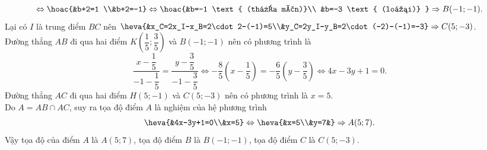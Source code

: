 \begin{bt}
{		\[\Leftrightarrow \hoac{&b+2=1 \\&b+2=-1} \Leftrightarrow \hoac{&b=-1 \text{ (thỏa mãn)}\\	&b=-3 \text{ (loại)} } \Rightarrow B(-1;-1).\]
		Lại có $I$ là trung điểm $BC$ nên $\heva{&x_C=2x_I-x_B=2\cdot 2-(-1)=5\\&y_C=2y_I-y_B=2\cdot(-2)-(-1)=-3} \Rightarrow C(5;-3)$.\\
		Đường thẳng $AB$ đi qua hai điểm $K\left(\dfrac{1}{5}; \dfrac{3}{5}\right)$ và $B(-1;-1)$ nên có phương trình là
		\[\dfrac{x-\dfrac{1}{5}}{-1-\dfrac{1}{5}}=\dfrac{y-\dfrac{3}{5}}{-1-\dfrac{3}{5}} \Leftrightarrow-\dfrac{8}{5}\left(x-\dfrac{1}{5}\right)=-\dfrac{6}{5}\left(y-\dfrac{3}{5}\right) \Leftrightarrow 4 x-3 y+1=0.\]
		Đường thẳng $AC$ đi qua hai điểm $H(5;-1)$ và $C(5;-3)$ nên có phương trình là $x=5$.\\
		Do $A=AB \cap AC$, suy ra tọa độ điểm $A$ là nghiệm của hệ phương trình
		\[\heva{&4x-3y+1=0\\&x=5} \Leftrightarrow\heva{&x=5\\&y=7&} \Rightarrow A(5; 7).\]
		Vậy tọa độ của điểm $A$ là $A(5; 7)$, tọa độ điểm $B$ là $B(-1;-1)$, tọa độ điểm $C$ là $C(5;-3)$.
	}
\end{bt}